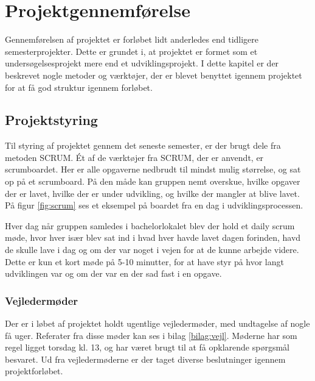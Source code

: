 \thispagestyle{fancy}
\chapter{Projektgennemførelse}
\label{chp:projektgennemforsel}

Gennemførelsen af projektet er forløbet lidt anderledes end tidligere semesterprojekter. Dette er grundet i, at projektet er formet som et undersøgelsesprojekt mere end et udviklingsprojekt. I dette kapitel er der beskrevet nogle metoder og værktøjer, der er blevet benyttet igennem projektet for at få god struktur igennem forløbet.

\section{Projektstyring}
\label{sec:projektstyring}

Til styring af projektet gennem det seneste semester, er der brugt dele fra metoden SCRUM.
Ét af de værktøjer fra SCRUM, der er anvendt, er scrumboardet. Her er alle opgaverne nedbrudt til mindst mulig størrelse, og sat op på et scrumboard. På den måde kan gruppen nemt overskue, hvilke opgaver der er lavet, hvilke der er under udvikling, og hvilke der mangler at blive lavet. På figur \ref{fig:scrum} ses et eksempel på boardet fra en dag i udviklingsprocessen. 


Hver dag når gruppen samledes i bachelorlokalet blev der hold et daily scrum møde, hvor hver især blev sat ind i hvad hver havde lavet dagen forinden, havd de skulle lave i dag og om der var noget i vejen for at de kunne arbejde videre. Dette er kun et kort møde på 5-10 minutter, for at have styr på hvor langt udviklingen var og om der var en der sad fast i en opgave.

\subsection{Vejledermøder}
Der er i løbet af projektet holdt ugentlige vejledermøder, med undtagelse af nogle få uger. Referater fra disse møder kan ses i bilag \ref{bilag:vejl}. Møderne har som regel ligget torsdag kl. 13, og har været brugt til at få opklarende spørgsmål besvaret. Ud fra vejledermøderne er der taget diverse beslutninger igennem projektforløbet.

